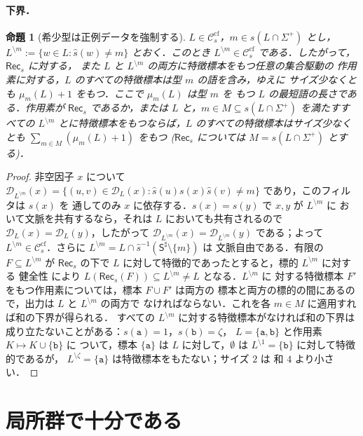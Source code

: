 \documentclass[11pt,a4paper]{ltjsarticle}
\numberwithin{equation}{section}
\theoremstyle{plain}
\newtheorem{proposition}[theorem]{命題}
\theoremstyle{definition}
\theoremstyle{remark}
\theoremstyle{plain}
\newcommand{\cf}{\mathrm{cf}}
\newcommand{\Ccf}[1]{\mathcal C_{#1}^{\cf}}
\newcommand{\Rec}{\mathsf{Rec}}
\newcommand{\D}{\mathcal{D}}
\begin{document}
\paragraph{下界．}
\begin{proposition}[希少型は正例データを強制する]
\label{prop:rare-type}
$L\in\Ccf{s}$，$m\in s(L\cap\Sigma^+)$ とし，
$L^{\setminus m}:=\{w\in L:\widehat s(w)\ne m\}$ とおく．このとき
$L^{\setminus m}\in\Ccf{s}$ である．したがって，$\Rec_s$ に対する，
また $L$ と $L^{\setminus m}$ の両方に特徴標本をもつ任意の集合駆動の
作用素に対する，$L$ のすべての特徴標本は型 $m$ の語を含み，ゆえに
サイズ少なくとも $\mu_m(L)+1$ をもつ．ここで $\mu_m(L)$ は型 $m$ を
もつ $L$ の最短語の長さである．作用素が $\Rec_s$ であるか，または $L$
と，$m\in M\subseteq s(L\cap\Sigma^+)$ を満たすすべての $L^{\setminus m}$
とに特徴標本をもつならば，$L$ のすべての特徴標本はサイズ少なくとも
$\sum_{m\in M}(\mu_m(L)+1)$ をもつ
\textup($\Rec_s$ については $M=s(L\cap\Sigma^+)$ とする\textup)．
\end{proposition}

\begin{proof}
非空因子 $x$ について $\D_{L^{\setminus m}}(x)=\{(u,v)\in\D_L(x):
\widehat s(u)s(x)\widehat s(v)\ne m\}$ であり，このフィルタは $s(x)$ を
通してのみ $x$ に依存する．$s(x)=s(y)$ で $x,y$ が $L^{\setminus m}$ に
おいて文脈を共有するなら，それは $L$ においても共有されるので
$\D_L(x)=\D_L(y)$，したがって
$\D_{L^{\setminus m}}(x)=\D_{L^{\setminus m}}(y)$ である；よって
$L^{\setminus m}\in\Ccf{s}$．さらに
$L^{\setminus m}=L\cap\widehat s^{-1}(\mathsf S^\sharp\setminus\{m\})$ は
文脈自由である．有限の $F\subseteq L^{\setminus m}$ が $\Rec_s$ の下で
$L$ に対して特徴的であったとすると，標的 $L^{\setminus m}$ に対する
健全性 \cite[定理~4.2]{kuriyamaCFG} により
$L(\Rec_s(F))\subseteq L^{\setminus m}\ne L$ となる．$L^{\setminus m}$ に
対する特徴標本 $F'$ をもつ作用素については，標本 $F\cup F'$ は両方の
標本と両方の標的の間にあるので，出力は $L$ と $L^{\setminus m}$ の両方で
なければならない．これを各 $m\in M$ に適用すれば和の下界が得られる．
すべての $L^{\setminus m}$ に対する特徴標本がなければ和の下界は
成り立たないことがある：$s(\mathtt a)=1$，$s(\mathtt b)=\zeta$，
$L=\{\mathtt a,\mathtt b\}$ と作用素 $K\mapsto K\cup\{\mathtt b\}$ に
ついて，標本 $\{\mathtt a\}$ は $L$ に対して，$\emptyset$ は
$L^{\setminus1}=\{\mathtt b\}$ に対して特徴的であるが，
$L^{\setminus\zeta}=\{\mathtt a\}$ は特徴標本をもたない；サイズ $2$ は
和 $4$ より小さい．
\end{proof}

\section{局所群で十分である}
\label{sec:lg}
\end{document}
